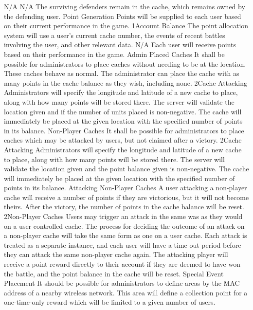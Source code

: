 			{N/A}
			{N/A}
			{The surviving defenders remain in the cache, which remains owned by the defending user.}
		\funcreq
			{Point Generation}
			{Points will be supplied to each user based on their current performance in the game.}
			{1}{Account Balance}
			{The point allocation system will use a user's current cache number, the events of recent battles involving the user, and other relevant data.}
			{N/A}
			{Each user will receive points based on their performance in the game.}
		\funcreq
			{Admin Placed Caches}
			{It shall be possible for administrators to place caches without needing to be at the location. These caches behave as normal. The administrator can place the cache with as many points in the cache balance as they wish, including none.}
			{2}{Cache Attacking}
			{Administrators will specify the longitude and latitude of a new cache to place, along with how many points will be stored there.}
			{The server will validate the location given and if the number of units placed is non-negative.}
			{The cache will immediately be placed at the given location with the specified number of points in its balance.}
		\funcreq
			{Non-Player Caches}
			{It shall be possible for administrators to place caches which may be attacked by users, but not claimed after a victory.}
			{2}{Cache Attacking}
			{Administrators will specify the longitude and latitude of a new cache to place, along with how many points will be stored there.}
			{The server will validate the location given and the point balance given is non-negative.}
			{The cache will immediately be placed at the given location with the specified number of points in its balance.}
		\funcreq
			{Attacking Non-Player Caches}
			{A user attacking a non-player cache will receive a number of points if they are victorious, but it will not become theirs. After the victory, the number of points in the cache balance will be reset.}
			{2}{Non-Player Caches}
			{Users may trigger an attack in the same was as they would on a user controlled cache.}
			{The process for deciding the outcome of an attack on a non-player cache will take the same form as one on a user cache. Each attack is treated as a separate instance, and each user will have a time-out period before they can attack the same non-player cache again.}
			{The attacking player will receive a point reward directly to their account if they are deemed to have won the battle, and the point balance in the cache will be reset.}
		\funcreq
			{Special Event Placement}
			{It should be possible for administrators to define areas by the MAC address of a nearby wireless network. This area will define a collection point for a one-time-only reward which will be limited to a given number of users.}
